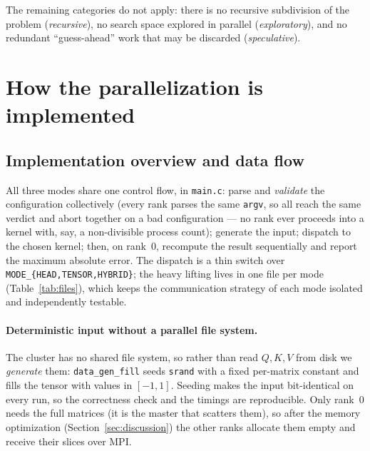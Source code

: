 \documentclass[11pt,a4paper]{article}
\newcommand{\code}[1]{\texttt{#1}}
\begin{document}
\noindent
The remaining categories do not apply: there is no recursive subdivision of the
problem (\emph{recursive}), no search space explored in parallel
(\emph{exploratory}), and no redundant ``guess-ahead'' work that may be discarded
(\emph{speculative}).

\section{How the parallelization is implemented}

\subsection{Implementation overview and data flow}
\label{sec:impl}
All three modes share one control flow, in \code{main.c}: parse and \emph{validate}
the configuration collectively (every rank parses the same \code{argv}, so all reach
the same verdict and abort together on a bad configuration --- no rank ever proceeds
into a kernel with, say, a non-divisible process count); generate the input;
dispatch to the chosen kernel; then, on rank~0, recompute the result sequentially
and report the maximum absolute error. The dispatch is a thin switch over
\code{MODE\_\{HEAD,TENSOR,HYBRID\}}; the heavy lifting lives in one file per mode
(Table~\ref{tab:files}), which keeps the communication strategy of each mode
isolated and independently testable.

\paragraph{Deterministic input without a parallel file system.}
The cluster has no shared file system, so rather than read $Q,K,V$ from disk we
\emph{generate} them: \code{data\_gen\_fill} seeds \code{srand} with a fixed
per-matrix constant and fills the tensor with values in $[-1,1]$. Seeding makes the
input bit-identical on every run, so the correctness check and the timings are
reproducible. Only rank~0 needs the full matrices (it is the master that scatters
them), so after the memory optimization (Section~\ref{sec:discussion}) the other
ranks allocate them empty and receive their slices over MPI.
\end{document}
